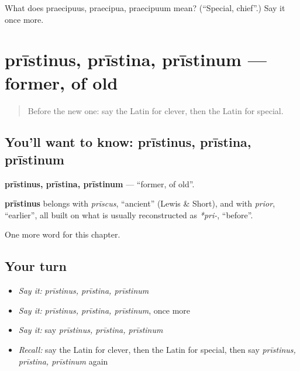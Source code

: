 \begin{tcolorbox}[breakable,colback=teal!4,colframe=teal!35!black,title={Before you move on}]
What does praecipuus, praecipua, praecipuum mean? (\textquotedblleft{}Special, chief\textquotedblright{}.) Say it once more.
\end{tcolorbox}
\section[prīstinus, prīstina, prīstinum]{prīstinus, prīstina, prīstinum — former, of old}

\label{lesson:LA-C267-pristinus}



\begin{quote}
Before the new one: say the Latin for clever, then the Latin for special.
\end{quote}

\subsection*{You'll want to know: prīstinus, prīstina, prīstinum}
\textbf{prīstinus, prīstina, prīstinum} — \textquotedblleft{}former, of old\textquotedblright{}.

\begin{cousinweb}
\textbf{prīstinus} belongs with \emph{prīscus}, \textquotedblleft{}ancient\textquotedblright{} (Lewis \& Short), and with \emph{prior}, \textquotedblleft{}earlier\textquotedblright{}, all built on what is usually reconstructed as \emph{*pri-}, \textquotedblleft{}before\textquotedblright{}.
\end{cousinweb}

\begin{grammarlens}[title={What you've built}]
One more word for this chapter.
\end{grammarlens}

\subsection*{Your turn}
\begin{itemize}
\raggedright
  \item \emph{Say it:} \emph{prīstinus, prīstina, prīstinum}
  \item \emph{Say it:} \emph{prīstinus, prīstina, prīstinum}, once more
  \item \emph{Say it:} say \emph{prīstinus, prīstina, prīstinum}
  \item \emph{Recall:} say the Latin for clever, then the Latin for special, then say \emph{prīstinus, prīstina, prīstinum} again
\end{itemize}

